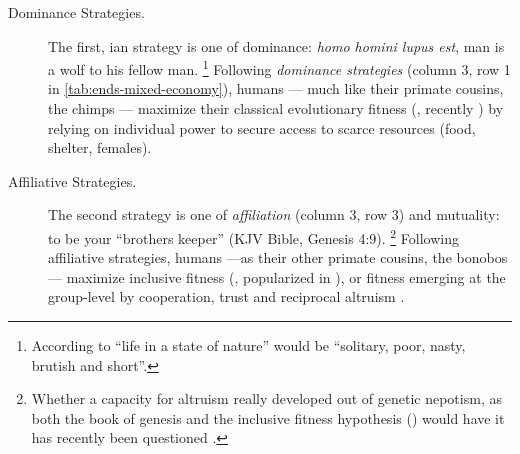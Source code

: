 \begin{description}
	\item[Dominance Strategies.]
	The first, \citeauthor{Hobbes-1651-aa}ian \citeyearpar{Hobbes-1651-aa}
	strategy is one of dominance:
	\emph{homo homini lupus est}, man is a wolf to his fellow man.
	\footnote{
		According to \cite{Hobbes-1651-aa} ``life in a state of nature'' would be ``solitary, poor, nasty, brutish and short''.
	}
	Following \emph{dominance strategies} (column 3, row 1 in \autoref{tab:ends-mixed-economy}), humans --- much like their primate cousins, the chimps --- maximize their classical evolutionary fitness (\citealt{Darwin1859}, recently \citealt{Dawkins1976}) by relying on individual power to secure access to scarce resources (food, shelter, females).

	\item[Affiliative Strategies.]
	The second strategy is one of \emph{affiliation} (column 3, row 3) and mutuality:
	to be your ``brothers keeper'' (\gls{KJV} Bible, Genesis 4:9).
	\footnote{
		Whether a capacity for altruism really developed out of genetic nepotism, as both the book of genesis and the inclusive fitness hypothesis (\citealt{Hamilton1964,Wilson1975}) would have it has recently been questioned \citep{Wilson2012}.
	}
	Following affiliative strategies, humans ---as their other primate cousins, the bonobos --- maximize inclusive fitness (\citealt{Hamilton1964}, popularized in \citealt{Wilson1975}), or fitness emerging at the group-level \citep{Wilson2012} by cooperation, trust and reciprocal altruism \citeyearpar[202ff]{Pickett-2009-kx}.
\end{description}



